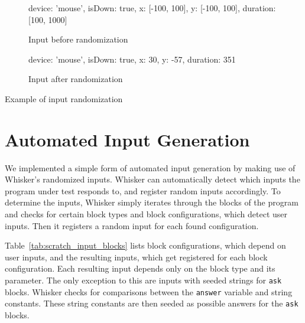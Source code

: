 \begin{listing}[htpb]
    \centering

    \begin{subfigure}[b]{.35\textwidth}
        \begin{javascriptcode}
            {
                device: 'mouse',
                isDown: true,
                x: [-100, 100],
                y: [-100, 100],
                duration: [100, 1000]
            }
        \end{javascriptcode}
        \vspace{-\bigskipamount}
        \caption{Input before randomization}
    \end{subfigure}
    \hspace{.08\textwidth}
    \begin{subfigure}[b]{.35\textwidth}
        \begin{javascriptcode}
            {
                device: 'mouse',
                isDown: true,
                x: 30,
                y: -57,
                duration: 351
            }
        \end{javascriptcode}
        \vspace{-\bigskipamount}
        \caption{Input after randomization}
    \end{subfigure}

    \caption{Example of input randomization}
    \label{fig:input_randomization_example}
\end{listing}

\section{Automated Input Generation}
\label{sec:automated_input_generation}

We implemented a simple form of automated input generation by making use of Whisker's randomized inputs.
Whisker can automatically detect which inputs the program under test responds to,
and register random inputs accordingly.
To determine the inputs,
Whisker simply iterates through the blocks of the program and checks for certain block types and block configurations,
which detect user inputs.
Then it registers a random input for each found configuration.
\parspace

Table~\ref{tab:scratch_input_blocks} lists block configurations, which depend on user inputs,
and the resulting inputs, which get registered for each block configuration.
Each resulting input depends only on the block type and its parameter.
The only exception to this are inputs with seeded strings for \texttt{ask} blocks.
Whisker checks for comparisons between the \texttt{answer} variable and string constants.
These string constants are then seeded as possible answers for the \texttt{ask} blocks.

